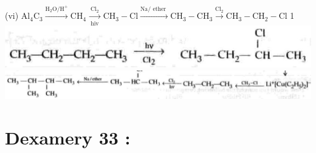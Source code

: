 \documentclass[10pt]{article}
\begin{document}
(vi) $\mathrm{Al}_{4} \mathrm{C}_{3} \xrightarrow{\mathrm{H}_{2} \mathrm{O} / \mathrm{H}^{+}} \mathrm{CH}_{4} \xrightarrow[\text { hiv }]{\mathrm{Cl}_{2}} \mathrm{CH}_{3}-\mathrm{Cl} \xrightarrow{\mathrm{Na} / \text { ether }} \mathrm{CH}_{3}-\mathrm{CH}_{3} \xrightarrow{\mathrm{Cl}_{2}} \mathrm{CH}_{3}-\mathrm{CH}_{2}-\mathrm{Cl}$ 1\\
\includegraphics[max width=\textwidth, center]{2025_01_28_8470952b98110cec3aabg-226(2)}\\
\includegraphics[max width=\textwidth, center]{2025_01_28_8470952b98110cec3aabg-226(1)}

\section*{Dexamery 33 :}
\end{document}
